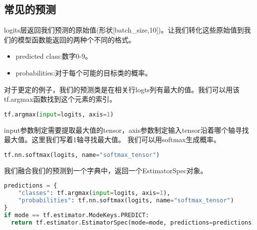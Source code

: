 \subsection{常见的预测}
logits层返回我们预测的原始值(形状[batch\_size,10])。让我们转化这些原始值到我们的模型函数能返回的两种个不同的格式。
\begin{itemize}
\item predicted class:数字0-9。
\item probabilities:对于每个可能的目标类的概率。
\end{itemize}
对于更定的例子，我们的预测类是在相关行logts列有最大的值。我们可以用该tf.argmax函数找到这个元素的索引。
\begin{lstlisting}[language=Python]
tf.argmax(input=logits, axis=1)
\end{lstlisting}
input参数制定需要提取最大值的tensor，axis参数制定输入tensor沿着哪个轴寻找最大值。这里我们写着1轴寻找最大值。
我们可以用softmax生成概率。
\begin{lstlisting}[language=Python]
tf.nn.softmax(logits, name="softmax_tensor")
\end{lstlisting}
我们融合我们的预测到一个字典中，返回一个EstimatorSpec对象。
\begin{lstlisting}[language=Python]
predictions = {
    "classes": tf.argmax(input=logits, axis=1),
    "probabilities": tf.nn.softmax(logits, name="softmax_tensor")
}
if mode == tf.estimator.ModeKeys.PREDICT:
  return tf.estimator.EstimatorSpec(mode=mode, predictions=predictions)
\end{lstlisting}
